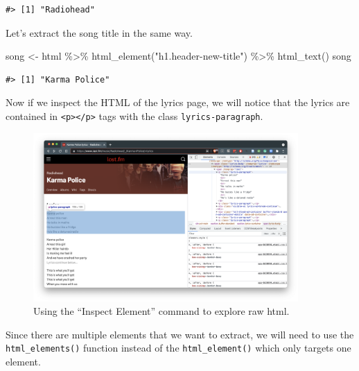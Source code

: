 \documentclass[
  letterpaper,
]{latex/krantz}
\newenvironment{Shaded}{\begin{snugshade}}{\end{snugshade}}
\newcommand{\FunctionTok}[1]{\textcolor[rgb]{0.28,0.35,0.67}{#1}}
\newcommand{\NormalTok}[1]{\textcolor[rgb]{0.00,0.23,0.31}{#1}}
\newcommand{\OtherTok}[1]{\textcolor[rgb]{0.00,0.23,0.31}{#1}}
\newcommand{\SpecialCharTok}[1]{\textcolor[rgb]{0.37,0.37,0.37}{#1}}
\newcommand{\StringTok}[1]{\textcolor[rgb]{0.13,0.47,0.30}{#1}}
\begin{document}
\begin{verbatim}
#> [1] "Radiohead"
\end{verbatim}

Let's extract the song title in the same way.

\begin{Shaded}
\begin{Highlighting}[]
\NormalTok{song }\OtherTok{\textless{}{-}} 
\NormalTok{  html }\SpecialCharTok{\%\textgreater{}\%} 
  \FunctionTok{html\_element}\NormalTok{(}\StringTok{"h1.header{-}new{-}title"}\NormalTok{) }\SpecialCharTok{\%\textgreater{}\%} 
  \FunctionTok{html\_text}\NormalTok{()}
\NormalTok{song}
\end{Highlighting}
\end{Shaded}

\begin{verbatim}
#> [1] "Karma Police"
\end{verbatim}

Now if we inspect the HTML of the lyrics page, we will notice that the
lyrics are contained in
\texttt{\textless{}p\textgreater{}\textless{}/p\textgreater{}} tags with
the class \texttt{lyrics-paragraph}.

\begin{figure}

{\centering \includegraphics[width=0.9\textwidth,height=\textheight]{./figures/acquire-data/ad-lastfm-lyrics-inspect.png}

}

\caption{\label{fig-ad-inspect-element-lyrics-lastfm}Using the ``Inspect
Element'' command to explore raw html.}

\end{figure}

Since there are multiple elements that we want to extract, we will need
to use the \texttt{html\_elements()} function instead of the
\texttt{html\_element()} which only targets one element.
\end{document}
